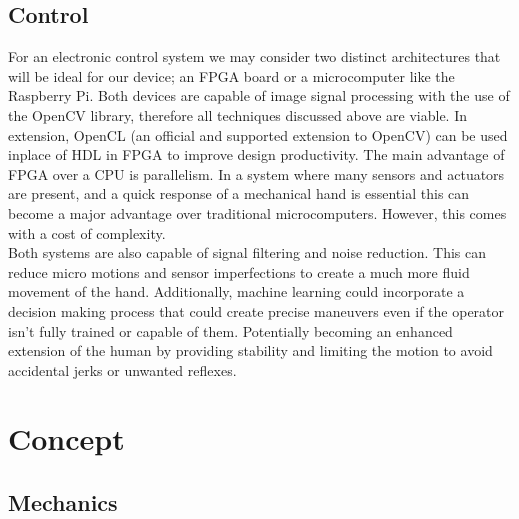 \documentclass{article}
\begin{document}
\subsection{Control}

For an electronic control system we may consider two distinct architectures that will be ideal for our device; an FPGA board or a microcomputer like the Raspberry Pi. Both devices are capable of image signal processing with the use of the OpenCV library, therefore all techniques discussed above are viable. In extension, OpenCL (an official and supported extension to OpenCV) can be used inplace of HDL in FPGA to improve design productivity. The main advantage of FPGA over a CPU is parallelism\cite{FPGA}. In a system where many sensors and actuators are present, and a quick response of a mechanical hand is essential this can become a major advantage over traditional microcomputers. However, this comes with a cost of complexity.\\[12pt]
\indent Both systems are also capable of signal filtering and noise reduction. This can reduce micro motions and sensor imperfections to create a much more fluid movement of the hand. Additionally, machine learning could incorporate a decision making process that could create precise maneuvers even if the operator isn't fully trained or capable of them.  Potentially becoming an enhanced extension of the human by providing stability and limiting the motion to avoid accidental jerks or unwanted reflexes.

\section{Concept}
\subsection{Mechanics}
\end{document}
